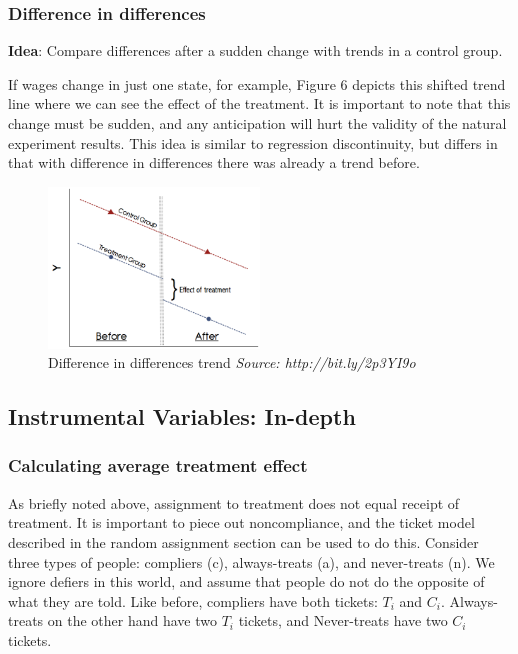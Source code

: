 \subsubsection{Difference in differences}
\textbf{Idea}: Compare differences after a sudden change with trends in a control group. 

If wages change in just one state, for example, Figure 6 depicts this shifted trend line where we can see the effect of the treatment.  It is important to note that this change must be sudden, and any anticipation will hurt the validity of the natural experiment results.  This idea is similar to regression discontinuity, but differs in that with difference in differences there was already a trend before. 

\begin{figure}[ht]
  \begin{center}
    \includegraphics[width=0.5\textwidth]{figures/fig6}
        \caption{Difference in differences trend \textit{ Source: http://bit.ly/2p3YI9o}}
    \label{figure 6}
  \end{center}
\end{figure}

\subsection{Instrumental Variables: In-depth}

\subsubsection{Calculating average treatment effect}

As briefly noted above, assignment to treatment does not equal receipt of treatment. It is important to piece out noncompliance, and the ticket model described in the random assignment section can be used to do this.  Consider three types of people: compliers (c), always-treats (a), and never-treats (n).  We ignore defiers in this world, and assume that people do not do the opposite of what they are told.  Like before, compliers have both tickets: $T_i$ and $C_i$.  Always-treats on the other hand have two $T_i$ tickets, and Never-treats have two $C_i$ tickets.  

